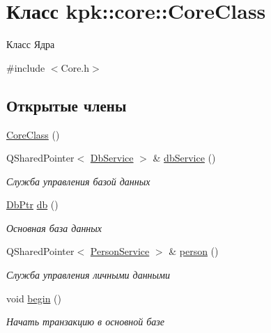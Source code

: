 \hypertarget{classkpk_1_1core_1_1_core_class}{}\section{Класс kpk\+:\+:core\+:\+:Core\+Class}
\label{classkpk_1_1core_1_1_core_class}


Класс Ядра  




{\ttfamily \#include $<$Core.\+h$>$}

\subsection*{Открытые члены}
\begin{DoxyCompactItemize}
\item 
\hyperlink{classkpk_1_1core_1_1_core_class_a5dc08a07fb3d8e84da07623d7739261a}{Core\+Class} ()
\item 
Q\+Shared\+Pointer$<$ \hyperlink{classkpk_1_1core_1_1_db_service}{Db\+Service} $>$ \& \hyperlink{classkpk_1_1core_1_1_core_class_a98a1fe99a1e3a6e99b8539995b539e43}{db\+Service} ()
\begin{DoxyCompactList}\small\item\em Служба управления базой данных \end{DoxyCompactList}\item 
\hyperlink{namespacekpk_1_1core_a57462cfcc109ed2afcc118d0668710cf}{Db\+Ptr} \hyperlink{classkpk_1_1core_1_1_core_class_aeb0cc8cb53c4ab4dc945226bd4f349d2}{db} ()
\begin{DoxyCompactList}\small\item\em Основная база данных \end{DoxyCompactList}\item 
Q\+Shared\+Pointer$<$ \hyperlink{classkpk_1_1core_1_1_person_service}{Person\+Service} $>$ \& \hyperlink{classkpk_1_1core_1_1_core_class_a5de72b91f0c71183286d643dc3fca8b7}{person} ()
\begin{DoxyCompactList}\small\item\em Служба управления личными данными \end{DoxyCompactList}\item 
void \hyperlink{classkpk_1_1core_1_1_core_class_addd4edd20d222119a0ddc384ee73cfb9}{begin} ()
\begin{DoxyCompactList}\small\item\em Начать транзакцию в основной базе \end{DoxyCompactList}\item 

\end{DoxyCompactItemize}
